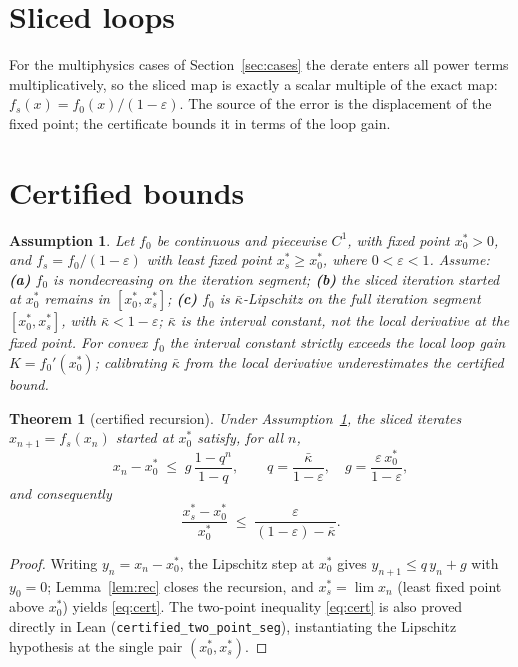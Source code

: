 \documentclass[11pt]{article}
\newtheorem{theorem}{Theorem}[section]
\newtheorem{assumption}{Assumption}[section]
\numberwithin{equation}{section}
\begin{document}
\section{Sliced loops}
For the multiphysics cases of Section~\ref{sec:cases} the derate enters all
power terms multiplicatively, so the sliced map is exactly a scalar multiple
of the exact map: $f_s(x)=f_0(x)/(1-\varepsilon)$. The source of the error is
the displacement of the fixed point; the certificate bounds it in terms of the
loop gain.

\section{Certified bounds}
\begin{assumption}\label{ass:main}
Let $f_0$ be continuous and piecewise $C^1$, with fixed point $x_0^*>0$, and
$f_s=f_0/(1-\varepsilon)$ with least fixed point $x_s^*\ge x_0^*$, where
$0<\varepsilon<1$. Assume:
\textbf{(a)} $f_0$ is nondecreasing on the iteration segment;
\textbf{(b)} the sliced iteration started at $x_0^*$ remains in
$[x_0^*,x_s^*]$;
\textbf{(c)} $f_0$ is $\bar\kappa$-Lipschitz on the full iteration segment
$[x_0^*,x_s^*]$, with $\bar\kappa<1-\varepsilon$; $\bar\kappa$ is the interval
constant, not the local derivative at the fixed point. For convex $f_0$ the
interval constant strictly exceeds the local loop gain
$K=f_0'(x_0^*)$; calibrating $\bar\kappa$ from the local derivative
underestimates the certified bound.
\end{assumption}

\begin{theorem}[certified recursion]\label{thm:cert}
Under Assumption~\ref{ass:main}, the sliced iterates $x_{n+1}=f_s(x_n)$
started at $x_0^*$ satisfy, for all $n$,
\[
x_n-x_0^*\;\le\;g\,\frac{1-q^n}{1-q},\qquad
q=\frac{\bar\kappa}{1-\varepsilon},\quad
g=\frac{\varepsilon\,x_0^*}{1-\varepsilon},
\]
and consequently
\begin{equation}\label{eq:cert}
\frac{x_s^*-x_0^*}{x_0^*}\;\le\;\frac{\varepsilon}{(1-\varepsilon)-\bar\kappa}.
\end{equation}
\end{theorem}
\begin{proof}
Writing $y_n=x_n-x_0^*$, the Lipschitz step at $x_0^*$ gives
$y_{n+1}\le q\,y_n+g$ with $y_0=0$; Lemma~\ref{lem:rec} closes the recursion,
and $x_s^*=\lim x_n$ (least fixed point above $x_0^*$) yields
\eqref{eq:cert}. The two-point inequality \eqref{eq:cert} is also proved
directly in Lean (\texttt{certified\_two\_point\_seg}), instantiating the
Lipschitz hypothesis at the single pair $(x_0^*,x_s^*)$.
\end{proof}
\end{document}
